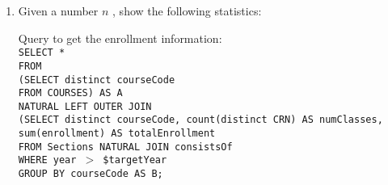 \begin{enumerate}
\begin{enumerate}
	
			\item 	Given a number $n$ , show the following statistics:
			
					Query to get the enrollment information:\\
					\texttt{SELECT * \\
							FROM\\
								\tab (SELECT distinct courseCode\\
								\tab FROM COURSES) AS A\\
								\tab NATURAL LEFT OUTER JOIN\\
								\tab (SELECT distinct courseCode, count(distinct CRN) AS numClasses, sum(enrollment) AS totalEnrollment\\
								\tab FROM Sections NATURAL JOIN consistsOf\\
								\tab WHERE year $>$ \$targetYear\\
								\tab GROUP BY courseCode AS B;}\\
		
	\end{enumerate}

\end{enumerate}